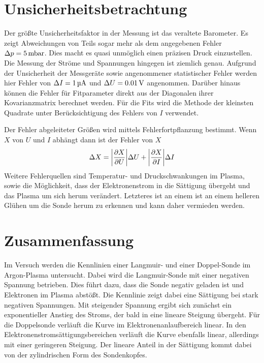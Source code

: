 \section{Unsicherheitsbetrachtung}
Der gr\"o\ss te Unsicherheitsfaktor in der Messung ist das veraltete Barometer.
Es zeigt Abweichungen von Teils sogar mehr als dem angegebenen Fehler $\Delta p=\SI{5}{\milli\bar}$.
Dies macht es quasi unm\"oglich einen pr\"azisen Druck einzustellen.
Die Messung der Str\"ome und Spannungen hingegen ist ziemlich genau.
Aufgrund der Unsicherheit der Messger\"ate sowie angenommener statistischer Fehler werden hier Fehler von $\Delta I=\SI{1}{\micro\ampere}$ und $\Delta U=\SI{0.01}{\volt}$ angenommen.
Dar\"uber hinaus k\"onnen die Fehler f\"ur Fitparameter direkt aus der Diagonalen ihrer Kovarianzmatrix berechnet werden.
F\"ur die Fits wird die Methode der kleinsten Quadrate unter Ber\"ucksichtigung des Fehlers von $I$ verwendet.

Der Fehler abgeleiteter Gr\"o\ss en wird mittels Fehlerfortpflanzung bestimmt.
Wenn $X$ von $U$ und $I$ abh\"angt dann ist der Fehler von $X$
\begin{equation}
\Delta X = \abs{\frac{\partial X}{\partial U}}\Delta U +  \abs{\frac{\partial X}{\partial I}}\Delta I
\end{equation}
Weitere Fehlerquellen sind Temperatur- und Druckschwankungen im Plasma, sowie die M\"oglichkeit, dass der Elektronenstrom in die S\"attigung \"ubergeht und das Plasma um sich herum ver\"andert.
Letzteres ist an einem ist an einem helleren Gl\"uhen um die Sonde herum zu erkennen und kann daher vermieden werden.

\section{Zusammenfassung}
Im Versuch werden die Kennlinien einer Langmuir- und einer Doppel-Sonde im Argon-Plasma untersucht.
Dabei wird die Langmuir-Sonde mit einer negativen Spannung betrieben.
Dies f\"uhrt dazu, dass die Sonde negativ geladen ist und Elektronen im Plasma abst\"o\ss t.
Die Kennlinie zeigt dabei eine S\"attigung bei stark negativen Spannungen.
Mit steigender Spannung ergibt sich zun\"achst ein exponentieller Anstieg des Stroms, der bald in eine lineare Steigung \"ubergeht.
F\"ur die Doppelsonde verl\"auft die Kurve im Elektronenanlaufbereich linear.
In den Elektronenstroms\"attigungsbereichen verl\"auft die Kurve ebenfalls linear, allerdings mit einer geringeren Steigung.
Der lineare Anteil in der S\"attigung kommt dabei von der zylindrischen Form des Sondenkopfes.

